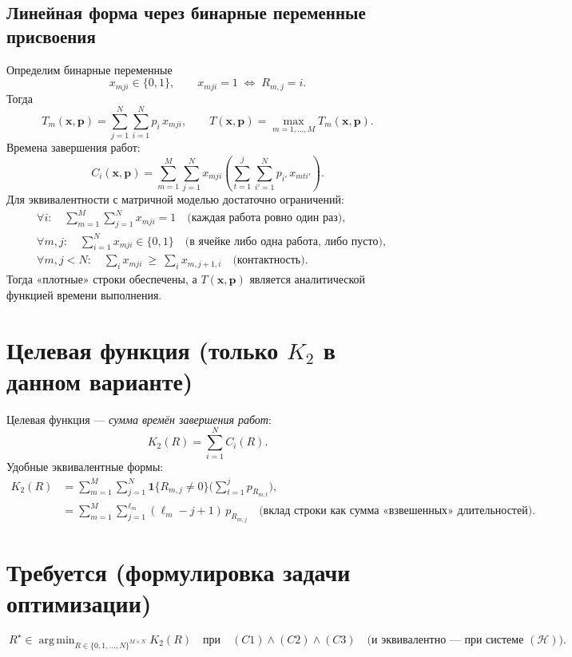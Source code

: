 \documentclass[a4paper,12pt]{article}
\newcommand{\1}{\mathbf{1}} %
\DeclareMathOperator{\argmin}{arg\,min}
\begin{document}
\subsection*{Линейная форма через бинарные переменные присвоения}
Определим бинарные переменные
\[
  x_{mji} \in \{0,1\},
  \qquad
  x_{mji}=1 \;\Longleftrightarrow\; R_{m,j}=i.
\]
Тогда
\[
  T_m(\mathbf{x},\mathbf{p})
  =
  \sum_{j=1}^{N}\sum_{i=1}^{N} p_i\,x_{mji},
  \qquad
  T(\mathbf{x},\mathbf{p})=\max_{m=1,\dots,M} T_m(\mathbf{x},\mathbf{p}).
\]
Времена завершения работ:
\[
  C_i(\mathbf{x},\mathbf{p})
  =
  \sum_{m=1}^{M}\sum_{j=1}^{N}
     x_{mji}\!\left(\sum_{t=1}^{j}\sum_{i'=1}^{N} p_{i'}\,x_{mt i'}\right).
\]
Для эквивалентности с матричной моделью достаточно ограничений:
\[
\begin{aligned}
& \forall i:\quad \sum_{m=1}^{M}\sum_{j=1}^{N} x_{mji}=1 \quad\text{(каждая работа ровно один раз)},\\
& \forall m,j:\quad \sum_{i=1}^{N} x_{mji}\in\{0,1\} \quad\text{(в ячейке либо одна работа, либо пусто)},\\
& \forall m,j<N:\quad \sum_{i}x_{mji}\ \ge\ \sum_{i}x_{m,j+1,i} \quad\text{(контактность)}.
\end{aligned}
\]
Тогда «плотные» строки обеспечены, а $T(\mathbf{x},\mathbf{p})$ является аналитической функцией времени выполнения.

\section{Целевая функция (только $K_2$ в данном варианте)}
Целевая функция — \emph{сумма времён завершения работ}:
\[
  K_2(R)=\sum_{i=1}^{N} C_i(R).
\]
Удобные эквивалентные формы:
\begin{align*}
K_2(R)
&=\sum_{m=1}^{M}\sum_{j=1}^{N}\1\{R_{m,j}\neq 0\}\Biggl(\sum_{t=1}^{j}p_{R_{m,t}}\Biggr),\\
&=\sum_{m=1}^{M}\sum_{j=1}^{\ell_m}(\ell_m-j+1)\,p_{R_{m,j}}
\quad\text{(вклад строки как сумма «взвешенных» длительностей).}
\end{align*}

\section{Требуется (формулировка задачи оптимизации)}
\[
  \boxed{~
  R^\star\in\argmin_{R\in\{0,1,\dots,N\}^{M\times N}}
  K_2(R)
  \quad\text{при}\quad
  (C1)\wedge(C2)\wedge(C3) 
  \quad\text{(и эквивалентно — при системе } (\mathcal H) \text{)}.~}
\]
\end{document}
